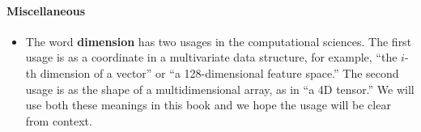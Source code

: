 \documentclass[12pt,letterpaper]{article}
\begin{document}
\paragraph{Miscellaneous}
\begin{itemize}
\item The word {\bf dimension} has two usages in the computational sciences. The first usage is as a coordinate in a multivariate data structure, for example, ``the $i$-th dimension of a vector'' or ``a 128-dimensional feature space.'' The second usage is as the shape of a multidimensional array, as in ``a 4D tensor.'' We will use both these meanings in this book and we hope the usage will be clear from context.
\end{itemize}
\end{document}
